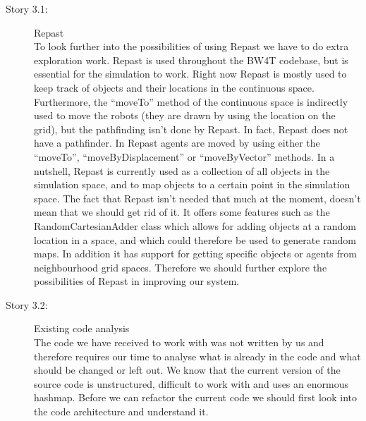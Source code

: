 \begin{description}
\item[Story 3.1:] Repast\\
To look further into the possibilities of using Repast we have to do extra exploration work.
Repast is used throughout the BW4T codebase, but is essential for the simulation to work.
Right now Repast is mostly used to keep track of objects and their locations in the continuous space.
Furthermore, the ``moveTo'' method of the continuous space is indirectly used to move the robots (they are drawn by using the location on the grid), but the pathfinding isn't done by Repast.
In fact, Repast does not have a pathfinder.
In Repast agents are moved by using either the ``moveTo'', ``moveByDisplacement'' or ``moveByVector'' methods.
In a nutshell, Repast is currently used as a collection of all objects in the simulation space, and to map objects to a certain point in the simulation space.
The fact that Repast isn't needed that much at the moment, doesn't mean that we should get rid of it.
It offers some features such as the RandomCartesianAdder class which allows for adding objects at a random location in a space, and which could therefore be used to generate random maps.
In addition it has support for getting specific objects or agents from neighbourhood grid spaces.
Therefore we should further explore the possibilities of Repast in improving our system.

\item[Story 3.2:] Existing code analysis\\
The code we have received to work with was not written by us and therefore requires our time to analyse what is already in the code and what should be changed or left out.
We know that the current version of the source code is unstructured, difficult to work with and uses an enormous hashmap.
Before we can refactor the current code we should first look into the code architecture and understand it.
\end{description}


